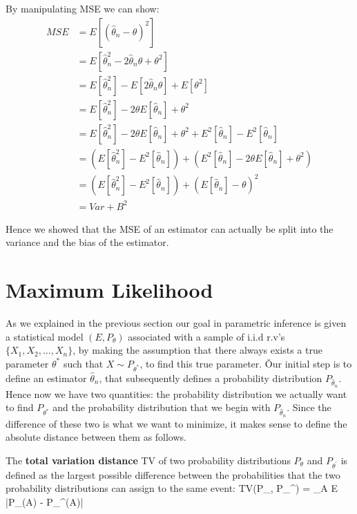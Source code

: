 By manipulating MSE we can show:
\begin{align*}
MSE &= E[(\hat{\theta}_{n} - \theta)^2] \\
&= E[\hat{\theta}_{n}^2 - 2\hat{\theta}_{n}\theta + \theta^2] \\
&= E[\hat{\theta}_{n}^2] - E[2 \hat{\theta}_{n} \theta] + E[\theta^2] \\
&= E[\hat{\theta}_{n}^2] - 2 \theta E[\hat{\theta}_{n}] + \theta^2 \\
&= E[\hat{\theta}_{n}^2] - 2 \theta E[\hat{\theta}_{n}] + \theta^2 + E^2[\hat{\theta}_{n}] - E^2[\hat{\theta}_{n}] \\
&= (E[\hat{\theta}_{n}^2] - E^2[\hat{\theta}_{n}]) + (E^2[\hat{\theta}_{n}] - 2 \theta E[\hat{\theta}_{n}] + \theta^2) \\
&= (E[\hat{\theta}_{n}^2] - E^2[\hat{\theta}_{n}]) + (E[\hat{\theta}_{n}] - \theta)^2 \\
&= Var + B^2
\end{align*}

Hence we showed that the MSE of an estimator can actually be split into the variance and the bias of the estimator.

\section{Maximum Likelihood}

As we explained in the previous section our goal in parametric inference is given a statistical model $(E,
P_{\theta})$ associated with a sample of i.i.d r.v's $\{ X_{1}, X_{2}, \ldots, X_{n} \}$, by making the assumption
that there always exists a true parameter $\theta^{*}$ such that $X \sim P_{\theta^{*}}$, to find this true parameter. \v

Our initial step is to define an estimator $\hat{\theta}_{n}$, that subsequently defines a probability distribution
$P_{\hat{\theta}_{n}}$. Hence now we have two quantities: the probability distribution we actually want to find
$P_{\theta^{*}}$ and the probability distribution that we begin with $P_{\hat{\theta}_{n}}$. Since the difference of
these two is what we want to minimize, it makes sense to define the absolute distance between them as follows.

The \textbf{total variation distance} TV of two probability distributions $P_{\theta}$ and $P_{\theta^{\prime}}$ is
defined as the largest possible difference between the probabilities that the two probability distributions can
assign to the same event:
\bse
TV(P_{\theta}, P_{\theta}^{\prime}) = \max_{A \subseteq E} |P_{\theta}(A) - P_{\theta}^{\prime}(A)|
\ese
\ed

